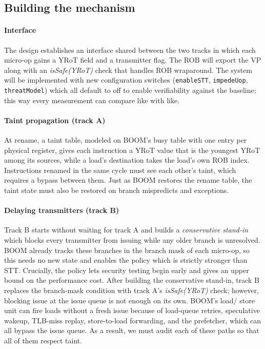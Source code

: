 \subsection{Building the mechanism}

\paragraph{Interface}
The design establishes an interface shared between the two tracks in which each micro-op 
gains a YRoT field and a transmitter flag. The ROB will export the VP along with an 
\textit{isSafe(YRoT)} check that handles ROB wraparound. The system will be implemented 
with new configuration switches (\texttt{enableSTT}, \texttt{impedeUop}, \texttt{threatModel}) 
which all default to off to enable verifiability against the baseline; this way every 
measurement can compare like with like.

\paragraph{Taint propagation (track A)}
At rename, a taint table, modeled on BOOM's busy table with one entry per physical 
register, gives each instruction a YRoT value that is the youngest YRoT among its sources, 
while a load's destination takes the load's own ROB index. Instructions renamed in the same
cycle must see each other's taint, which requires a bypass between them. Just as BOOM 
restores the rename table, the taint state must also be restored on branch mispredicts and exceptions.

\paragraph{Delaying transmitters (track B)}
Track B starts without waiting for track A and builds a \emph{conservative stand-in}
which blocks every transmitter from issuing while any older branch is unresolved.
BOOM already tracks these branches in the branch mask of each micro-op, so this needs no new 
state and enables the policy which is strictly stronger than STT. Crucially, the policy lets 
security testing begin early and gives an upper bound on the performance cost. After building the 
conservative stand-in, track B replaces the branch-mask condition with track A's \textit{isSafe(YRoT)} 
check; however, blocking issue at the issue queue is not enough on its own. BOOM's load/\allowbreak 
store unit can fire loads without a fresh issue because of load-queue retries, speculative wakeup, 
TLB-miss replay, store-to-load forwarding, and the prefetcher, which can all bypass the issue
queue. As a result, we must audit each of these paths so that all of them respect taint.

